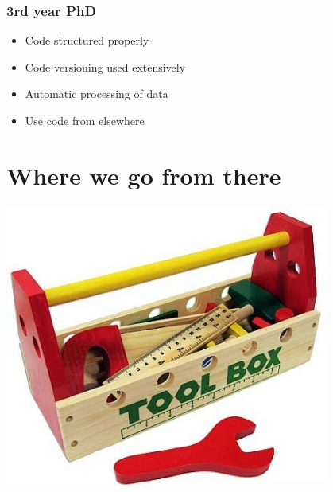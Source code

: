 \documentclass[14pt]{beamer}
\begin{document}
\begin{frame}
\frametitle{3rd year PhD}
\begin{itemize}
\item Code structured properly
\item Code versioning used extensively
\item Automatic processing of data
\item Use code from elsewhere
\end{itemize}
\end{frame}

\section{Where we go from there}
\begin{frame}
\centering
\includegraphics[width=0.8\textwidth]{wooden_tool_box}

\end{frame}
\end{document}
